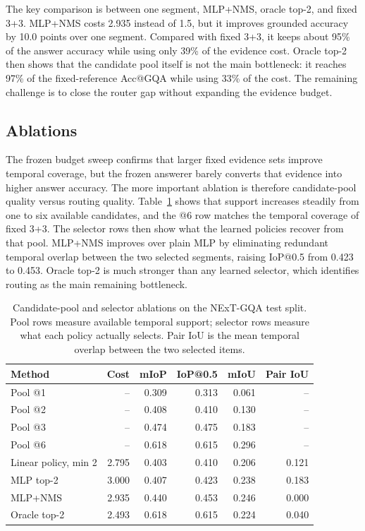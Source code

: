\documentclass{article}
\begin{document}
The key comparison is between one segment, MLP+NMS, oracle top-2, and fixed 3+3. MLP+NMS costs 2.935 instead of 1.5, but it improves grounded accuracy by 10.0 points over one segment. Compared with fixed 3+3, it keeps about 95\% of the answer accuracy while using only 39\% of the evidence cost. Oracle top-2 then shows that the candidate pool itself is not the main bottleneck: it reaches 97\% of the fixed-reference Acc@GQA while using 33\% of the cost. The remaining challenge is to close the router gap without expanding the evidence budget.

\subsection{Ablations}
The frozen budget sweep confirms that larger fixed evidence sets improve temporal coverage, but the frozen answerer barely converts that evidence into higher answer accuracy. The more important ablation is therefore candidate-pool quality versus routing quality. Table~\ref{tab:pool-ablation} shows that support increases steadily from one to six available candidates, and the @6 row matches the temporal coverage of fixed 3+3. The selector rows then show what the learned policies recover from that pool. MLP+NMS improves over plain MLP by eliminating redundant temporal overlap between the two selected segments, raising IoP@0.5 from 0.423 to 0.453. Oracle top-2 is much stronger than any learned selector, which identifies routing as the main remaining bottleneck.

\begin{table}[t]
  \centering
  \scriptsize
  \caption{Candidate-pool and selector ablations on the NExT-GQA test split. Pool rows measure available temporal support; selector rows measure what each policy actually selects. Pair IoU is the mean temporal overlap between the two selected items.}
  \label{tab:pool-ablation}
  \begin{tabular}{lrrrrr}
    \toprule
    Method & Cost & mIoP & IoP@0.5 & mIoU & Pair IoU \\
    \midrule
    Pool @1 & -- & 0.309 & 0.313 & 0.061 & -- \\
    Pool @2 & -- & 0.408 & 0.410 & 0.130 & -- \\
    Pool @3 & -- & 0.474 & 0.475 & 0.183 & -- \\
    Pool @6 & -- & 0.618 & 0.615 & 0.296 & -- \\
    \midrule
    Linear policy, min 2 & 2.795 & 0.403 & 0.410 & 0.206 & 0.121 \\
    MLP top-2 & 3.000 & 0.407 & 0.423 & 0.238 & 0.183 \\
    MLP+NMS & 2.935 & 0.440 & 0.453 & 0.246 & 0.000 \\
    Oracle top-2 & 2.493 & 0.618 & 0.615 & 0.224 & 0.040 \\
    \bottomrule
  \end{tabular}
\end{table}
\end{document}
